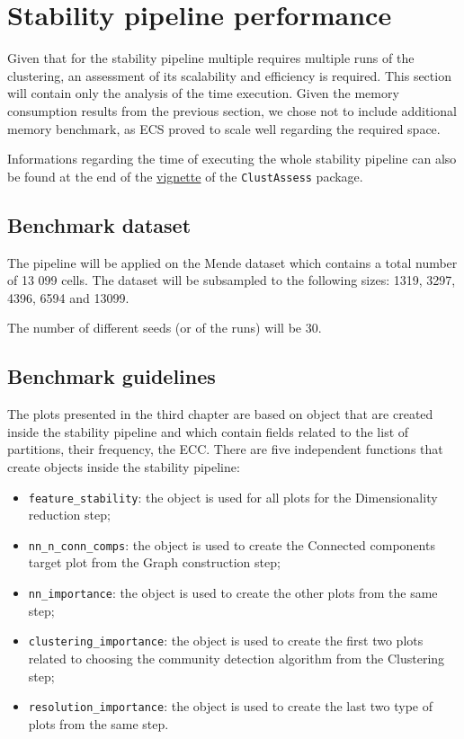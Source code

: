 \section{Stability pipeline performance}
Given that for the stability pipeline multiple requires multiple runs of the clustering, an assessment of its scalability and efficiency is required. This section will contain only the analysis of the time execution. Given the memory consumption results from the previous section, we chose not to include additional memory benchmark, as ECS proved to scale well regarding the required space.

Informations regarding the time of executing the whole stability pipeline can also be found at the end of the \href{https://core-bioinformatics.github.io/ClustAssess/articles/stability-based-parameter-assessment.html}{vignette} of the \verb|ClustAssess| package.

\subsection{Benchmark dataset}
The pipeline will be applied on the Mende dataset \cite{Mende2022} which contains a total number of 13 099 cells. The dataset will be subsampled to the following sizes: 1319, 3297, 4396, 6594 and 13099. 

The number of different seeds (or of the runs) will be 30.

\subsection{Benchmark guidelines}
The plots presented in the third chapter are based on object that are created inside the stability pipeline and which contain fields related to the list of partitions, their frequency, the ECC. There are five independent functions that create objects inside the stability pipeline:
\begin{itemize}
    \item \verb|feature_stability|: the object is used for all plots for the Dimensionality reduction step;
    \item \verb|nn_n_conn_comps|: the object is used to create the Connected components target plot from the Graph construction step;
    \item \verb|nn_importance|: the object is used to create the other plots from the same step;
    \item \verb|clustering_importance|: the object is used to create the first two plots related to choosing the community detection algorithm from the Clustering step;
    \item \verb|resolution_importance|: the object is used to create the last two type of plots from the same step.
\end{itemize}

